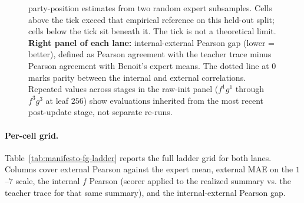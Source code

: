 \begin{figure}[t]
{    party-position estimates from two random expert subsamples. Cells
    above the tick exceed that empirical reference on this held-out split;
    cells below the tick sit beneath it. The tick is not a theoretical
    limit. \textbf{Right panel of each lane:} internal-external
    Pearson gap (lower = better), defined as Pearson agreement with the
    teacher trace minus Pearson agreement with Benoit's expert means.
    The dotted line at $0$ marks parity between the internal and
    external correlations. Repeated values across stages in the
    raw-init panel ($f^1 g^1$ through $f^3 g^3$ at leaf $256$) show
    evaluations inherited from the most recent post-update
    stage, not separate re-runs.}\label{fig:manifesto-fg-ladder-heatmaps}
\end{figure}

\paragraph{Per-cell grid.} Table~\ref{tab:manifesto-fg-ladder} reports
the full ladder grid for both lanes. Columns cover external Pearson
against the expert mean, external MAE on the $1$--$7$ scale, the
internal $f$ Pearson (scorer applied to the realized summary vs. the
teacher trace for that same summary), and the internal-external Pearson gap.

\begin{table}[htbp]
    \centering
    \resizebox*{!}{0.88\textheight}{\resizebox{\linewidth}{!}{}}
    \caption{Per-cell ladder grid on the economic policy dimension
    (seven-point scale).
    Stage labels use the notation defined in
    Figure~\ref{fig:manifesto-fg-ladder-heatmaps}.
    Both lanes collapse inherited stages (where a later stage reused
    the preceding evaluation) into the first stage at which each
    distinct evaluation appeared. Bold external-$r$ values are the
    best cell within each lane; bold internal-external gap values are
    the tightest (closest to parity) within each
    lane.}\label{tab:manifesto-fg-ladder}
\end{table}

